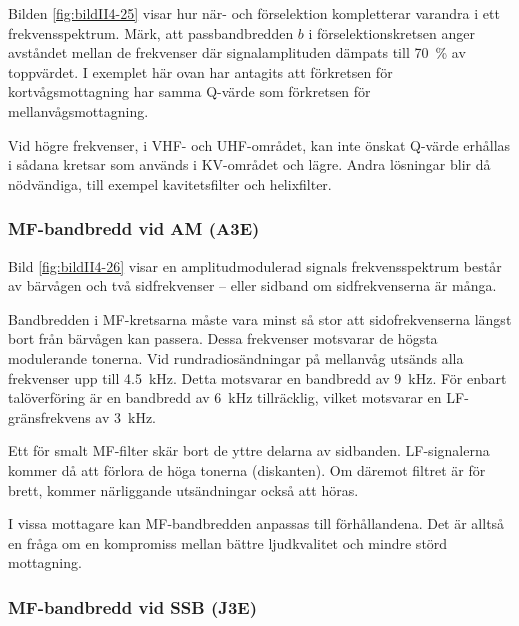 
Bilden \ref{fig:bildII4-25} visar hur när- och förselektion kompletterar
varandra i ett frekvensspektrum.
Märk, att passbandbredden \(b\) i förselektionskretsen anger avståndet mellan
de frekvenser där signalamplituden dämpats till 70~\% av toppvärdet.
I exemplet här ovan har antagits att förkretsen för kortvågsmottagning har
samma Q-värde som förkretsen för mellanvågsmottagning.

Vid högre frekvenser, i VHF- och UHF-området, kan inte önskat Q-värde
erhållas i sådana kretsar som används i KV-området och lägre.
Andra lösningar blir då nödvändiga, till exempel kavitetsfilter och helixfilter.

\subsubsection{MF-bandbredd vid AM (A3E)}


Bild \ref{fig:bildII4-26} visar en amplitudmodulerad signals frekvensspektrum
består av bärvågen och två sidfrekvenser -- eller sidband om sidfrekvenserna
är många.

Bandbredden i MF-kretsarna måste vara minst så stor att sidofrekvenserna
längst bort från bärvågen kan passera.
Dessa frekvenser motsvarar de högsta modulerande tonerna.
Vid rundradiosändningar på mellanvåg utsänds alla frekvenser upp till
\SI{4,5}{\kilo\hertz}.
Detta motsvarar en bandbredd av \SI{9}{\kilo\hertz}.
För enbart talöverföring är en bandbredd av \SI{6}{\kilo\hertz} tillräcklig,
vilket motsvarar en LF-gränsfrekvens av \SI{3}{\kilo\hertz}.

Ett för smalt MF-filter skär bort de yttre delarna av sidbanden.
LF-signalerna kommer då att förlora de höga tonerna (diskanten).
Om däremot filtret är för brett, kommer närliggande utsändningar också att
höras.

I vissa mottagare kan MF-bandbredden anpassas till förhållandena.
Det är alltså en fråga om en kompromiss mellan bättre ljudkvalitet och
mindre störd mottagning.

\subsubsection{MF-bandbredd vid SSB (J3E)}

